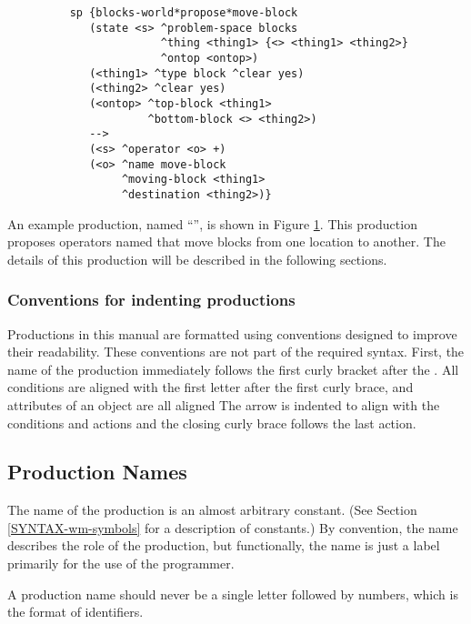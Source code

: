 \begin{figure}
	\begin{verbatim}
	sp {blocks-world*propose*move-block
	   (state <s> ^problem-space blocks
	              ^thing <thing1> {<> <thing1> <thing2>}
	              ^ontop <ontop>)
	   (<thing1> ^type block ^clear yes)
	   (<thing2> ^clear yes)
	   (<ontop> ^top-block <thing1>
	            ^bottom-block <> <thing2>)
	   -->
	   (<s> ^operator <o> +)
	   (<o> ^name move-block
	        ^moving-block <thing1>
	        ^destination <thing2>)}
	\end{verbatim}
	\label{fig:ex-prod}
\end{figure}

An example production, named ``'', is shown in Figure \ref{fig:ex-prod}. This production proposes operators named  that move blocks from one location to another. The details of this production will be described in the following sections.

\subsubsection*{Conventions for indenting productions}

Productions in this manual are formatted using conventions designed to improve their readability. These conventions are not part of the required syntax. First, the name of the production immediately follows the first curly bracket after the .  All conditions are aligned with the first letter after the first curly brace, and attributes of an object are all aligned The arrow is indented to align with the conditions and actions and the closing curly brace follows the last action.

\subsection{Production Names}

The name of the production is  an almost arbitrary constant. (See Section \ref{SYNTAX-wm-symbols} for a description of constants.) By convention, the name describes the role of the production, but functionally, the name is just a label primarily for the use of the programmer.

A production name should never be a single letter followed by numbers, which is the format of identifiers.

